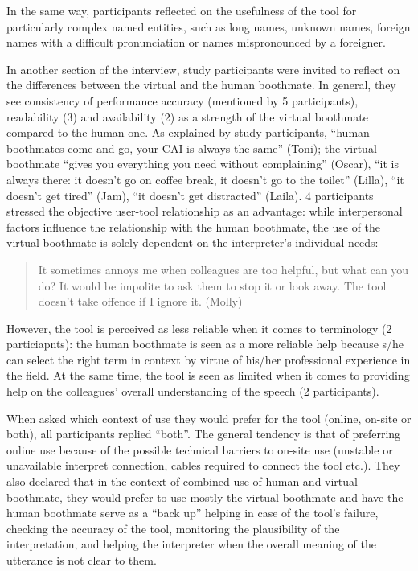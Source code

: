 In the same way, participants reflected on the usefulness of the tool for particularly complex named entities, such as long names, unknown names, foreign names with a difficult pronunciation or names mispronounced by a foreigner.

In another section of the interview, study participants were invited to reflect on the differences between the virtual and the human boothmate. In general, they see consistency of performance accuracy (mentioned by 5 participants), readability (3) and availability (2) as a strength of the virtual boothmate compared to the human one. As explained by study participants, ``human boothmates come and go, your CAI is always the same'' (Toni); the virtual boothmate ``gives you everything you need without complaining'' (Oscar), ``it is always there: it doesn’t go on coffee break, it doesn’t go to the toilet'' (Lilla), ``it doesn’t get tired'' (Jam), ``it doesn’t get distracted'' (Laila). 4 participants stressed the objective user-tool relationship as an advantage: while interpersonal factors influence the relationship with the human boothmate, the use of the virtual boothmate is solely dependent on the interpreter’s individual needs:
\begin{quote}
    It sometimes annoys me when colleagues are too helpful, but what can you do? It would be impolite to ask them to stop it or look away. The tool doesn’t take offence if I ignore it. (Molly)
\end{quote}
However, the tool is perceived as less reliable when it comes to terminology (2 particiapnts): the human boothmate is seen as a more reliable help because s/he can select the right term in context by virtue of his/her professional experience in the field. At the same time, the tool is seen as limited when it comes to providing help on the colleagues’ overall understanding of the speech (2 participants).

When asked which context of use they would prefer for the tool (online, on-site or both), all participants replied ``both''. The general tendency is that of preferring online use because of the possible technical barriers to on-site use (unstable or unavailable interpret connection, cables required to connect the tool etc.). They also declared that in the context of combined use of human and virtual boothmate, they would prefer to use mostly the virtual boothmate and have the human boothmate serve as a ``back up'' helping in case of the tool’s failure, checking the accuracy of the tool, monitoring the plausibility of the interpretation, and helping the interpreter when the overall meaning of the utterance is not clear to them.




